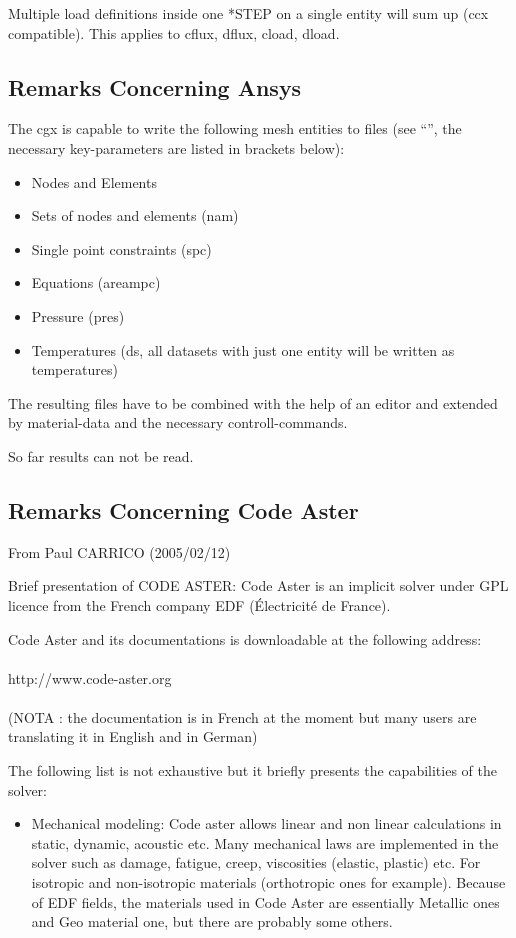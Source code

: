 \documentclass{article}
\begin{document}
\begin{appendix}
Multiple load definitions inside one *STEP on a single entity will sum up (ccx compatible). This applies to cflux, dflux, cload, dload.

\subsection{\label{Remarks Concerning Ansys}Remarks Concerning Ansys}
The cgx is capable to write the following mesh entities to files (see ``'', the necessary key-parameters are listed in brackets below):
\begin{itemize}
\item Nodes and Elements 
\item Sets of nodes and elements (nam)
\item Single point constraints (spc)
\item Equations (areampc)
\item Pressure (pres)
\item Temperatures (ds, all datasets with just one entity will be written as temperatures)
\end{itemize}
The resulting files have to be combined with the help of an editor and extended by material-data and the necessary controll-commands. 

So far results can not be read.

\subsection{\label{Remarks Concerning Code Aster}Remarks Concerning Code Aster}
From Paul CARRICO (2005/02/12)

Brief presentation of CODE ASTER: Code Aster is an implicit  solver under GPL licence from the French company EDF (\'{E}lectricit\'{e} de France).

Code Aster and its documentations is downloadable at the following address:\\\\http://www.code-aster.org\\\\(NOTA : the documentation is in French at the moment but many users are translating it in English and in German)

The following list is not exhaustive but it briefly presents the capabilities of the solver:

\begin{itemize}

\item Mechanical modeling: 
Code aster allows linear and non linear calculations in static, dynamic, acoustic etc. Many mechanical laws are implemented in the solver such as damage, fatigue, creep, viscosities (elastic, plastic) etc. For isotropic and non-isotropic materials (orthotropic ones for example).
Because of EDF fields, the materials used in Code Aster are essentially Metallic ones and Geo material one, but there are probably some others.


\end{itemize}
\end{appendix}
\end{document}
